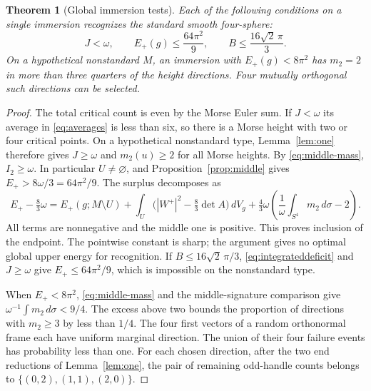 \documentclass[11pt,letterpaper]{article}
\numberwithin{equation}{section}
\newtheorem{theorem}{Theorem}[section]
\begin{document}
\begin{theorem}[Global immersion tests]\label{thm:recognition}
Each of the following conditions on a single immersion
recognizes the standard smooth four-sphere:
\[
 J<\omega,\qquad E_+(g)\le\frac{64\pi^2}{9},\qquad
 B\le\frac{16\sqrt2\,\pi}{3}.
\]
On a hypothetical nonstandard \(M\), an immersion with
\(E_+(g)<8\pi^2\) has \(m_2=2\) in more than three quarters
of the height directions. Four mutually orthogonal such
directions can be selected.
\end{theorem}
\begin{proof}
The total critical count is even by the Morse Euler sum.
If \(J<\omega\) its average in \eqref{eq:averages} is less
than six, so there is a Morse height with two or four critical
points. On a hypothetical nonstandard type, Lemma~\ref{lem:one}
therefore gives \(J\ge\omega\) and \(m_2(u)\ge2\) for all Morse
heights. By \eqref{eq:middle-mass}, \(I_2\ge\omega\). In particular
\(U\ne\varnothing\), and Proposition~\ref{prop:middle} gives
\(E_+>8\omega/3=64\pi^2/9\). The surplus decomposes as
\[
 E_+-\tfrac83\omega
 =E_+(g;M\setminus U)
  +\int_U\bigl(|W^+|^2-\tfrac83\det A\bigr)\,dV_g
  +\tfrac43\omega\left(\frac1\omega\int_{S^4}m_2\,d\sigma-2\right).
\]
All terms are nonnegative and the middle one is positive.
This proves inclusion of the endpoint. The pointwise
constant is sharp; the argument gives no optimal global
upper energy for recognition. If \(B\le16\sqrt2\,\pi/3\),
\eqref{eq:integrateddeficit} and \(J\ge\omega\) give
\(E_+\le64\pi^2/9\), which is impossible on the nonstandard type.

When \(E_+<8\pi^2\), \eqref{eq:middle-mass} and the
middle-signature comparison give
\(\omega^{-1}\int m_2\,d\sigma<9/4\). The excess above two
bounds the proportion of directions with \(m_2\ge3\) by
less than \(1/4\). The four first vectors of a random
orthonormal frame each have uniform marginal direction.
The union of their four failure events has probability
less than one. For each chosen direction, after the two
end reductions of Lemma~\ref{lem:one}, the pair of remaining
odd-handle counts belongs to \(\{(0,2),(1,1),(2,0)\}\).
\end{proof}
\end{document}
